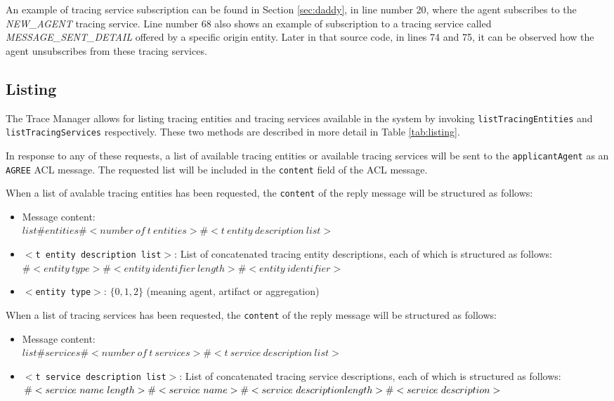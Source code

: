 			An example of tracing service subscription can be found in Section \ref{sec:daddy}, in line
			number 20, where the agent subscribes to the \textit{NEW\_AGENT} tracing service. Line
			number 68 also shows an example of subscription to a tracing service called
			\textit{MESSAGE\_SENT\_DETAIL} offered by a specific origin entity. Later in that source
			code, in lines 74 and 75, it can be observed how the agent unsubscribes from these tracing
			services.

		\subsection{Listing}\label{sec:listing}

			The Trace Manager allows for listing tracing entities and tracing services available in the
			system by invoking \lstinline{listTracingEntities} and \lstinline{listTracingServices}
			respectively. These two methods are described in more detail in Table \ref{tab:listing}.

			In response to any of these requests, a list of available tracing entities or available tracing
			services will be sent to the \texttt{applicantAgent} as an \texttt{AGREE} ACL message. The
			requested list will be included in the \texttt{content} field of the ACL message.

			When a list of avalable tracing entities has been requested, the \texttt{content} of the reply
			message will be structured as follows:

			\begin{itemize}
				\item Message content:\\
					$list\#entities\#<number\ of\ t\ entities>\#<t\ entity\ description\ list>$
				\item $<$\texttt{t entity description list}$>$: List of concatenated tracing entity
					descriptions, each of which is structured as follows:\\
					$\#<entity\ type>\#<entity\ identifier\ length>\#<entity\ identifier>$
				\item $<$\texttt{entity type}$>$: $\{0, 1, 2\}$ (meaning agent, artifact or
					aggregation)
			\end{itemize}

			When a list of tracing services has been requested, the \texttt{content} of the reply message
			will be structured as follows:

			\begin{itemize}
				\item Message content:\\
					$list\#services\#<number\ of\ t\ services>\#<t\ service\ description\ list>$
				\item $<$\texttt{t service description list}$>$: List of concatenated tracing service
					descriptions, each of which is structured as follows:\\
					$\#<service\ name\ length>\#<service\ name>\#<service\ description\ \\length>\#<service\ description>$
					\end{itemize}

